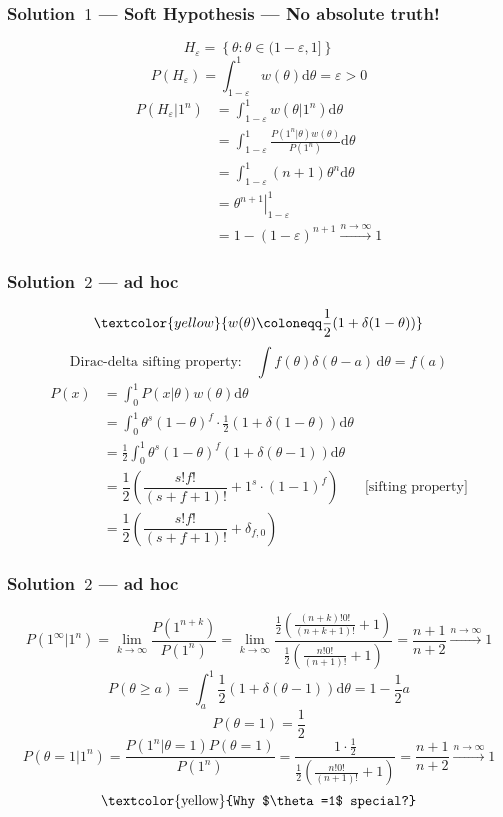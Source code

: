 \documentclass[UTF8,11pt,colorlinks,compress,openany]{beamer}%
\begin{document}
\begin{frame}\frametitle{Solution~$1$ --- Soft Hypothesis --- No absolute truth!}
	\vspace{-1em}
	\[H_\varepsilon=\left\{\theta:\theta\in(1-\varepsilon,1]\right\}\]
	\[P(H_\varepsilon)=\int_{1-\varepsilon}^1\!\! w(\theta)\mathrm{d}\theta=\varepsilon>0\]
	\begin{align*}
	P(H_\varepsilon|1^n)&=\int_{1-\varepsilon}^1\!\! w(\theta|1^n)\mathrm{d}\theta\\
	&=\int_{1-\varepsilon}^1\!\! \frac{P(1^n|\theta) w(\theta)}{P(1^n)}\mathrm{d}\theta\\
	&=\int_{1-\varepsilon}^1\!\! (n+1)\theta^n \mathrm{d}\theta\\
	&=\left.\theta^{n+1}\right|_{1-\varepsilon}^1\\
	&=1-(1-\varepsilon)^{n+1}\xrightarrow{n\to\infty} 1
	\end{align*}
\end{frame}

\begin{frame}\frametitle{Solution~$2$ --- ad hoc}
	\[\textcolor{yellow}{w(\theta)\coloneqq \dfrac{1}{2}(1+\delta(1-\theta))}\]
	\[\text{Dirac-delta sifting property:}\quad\int\!\! f(\theta)\delta(\theta-a)\,\mathrm{d}\theta=f(a)\]
	\begin{align*}
	P(x)&=\int_0^1\!\! P(x|\theta)w(\theta)\mathrm{d}\theta\\
	&=\int_0^1\!\! \theta^s(1-\theta)^f\cdot \frac{1}{2}(1+\delta(1-\theta))\mathrm{d}\theta\\
	&=\frac{1}{2}\int_0^1\!\! \theta^s(1-\theta)^f (1+\delta(\theta-1))\mathrm{d}\theta\\
	&=\dfrac{1}{2}\left(\dfrac{s!f!}{(s+f+1)!}+1^s\cdot (1-1)^f\right) &\text{[sifting property]}\\
	&=\dfrac{1}{2}\left(\dfrac{s!f!}{(s+f+1)!}+\delta_{f,0}\right)
	\end{align*}
\end{frame}

\begin{frame}\frametitle{Solution~$2$ --- ad hoc}
	\[P(1^\infty|1^n)=\lim\limits_{k\to\infty}\dfrac{P(1^{n+k})}{P(1^n)}=\lim\limits_{k\to\infty}\dfrac{\frac{1}{2}\left(\frac{(n+k)!0!}{(n+k+1)!}+1\right)}{\frac{1}{2}\left(\frac{n!0!}{(n+1)!}+1\right)}=\dfrac{n+1}{n+2}\xrightarrow{n\to\infty} 1\]
	\[P(\theta\geq a)=\int_{a}^1\!\frac{1}{2}(1+\delta(\theta-1))\mathrm{d}\theta=1-\frac{1}{2}a\]
	\[P(\theta=1)=\frac{1}{2}\]
	\[P(\theta=1|1^n)=\dfrac{P(1^n|\theta=1)P(\theta=1)}{P(1^n)}=\dfrac{1\cdot\frac{1}{2}}{\frac{1}{2}\left(\frac{n!0!}{(n+1)!}+1\right)}=\dfrac{n+1}{n+2}\xrightarrow{n\to\infty}1\]
	\[\text{\textcolor{yellow}{Why $\theta=1$ special?}}\]
\end{frame}
\end{document}
